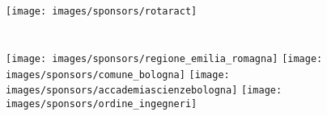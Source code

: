 \begin{center}
\begin{multicols}{4}
\texttt{[image: images/sponsors/rotaract]} 
\end{multicols}

\section*{\color{siamblue}{UNDER THE PATRONAGE OF}}
\vspace{0.1cm}

\begin{multicols}{4}
\texttt{[image: images/sponsors/regione\_emilia\_romagna]}
\texttt{[image: images/sponsors/comune\_bologna]}
\texttt{[image: images/sponsors/accademiascienzebologna]}
\texttt{[image: images/sponsors/ordine\_ingegneri]}
\end{multicols}

\end{center}
\setlength{\columnseprule}{0.5pt}


